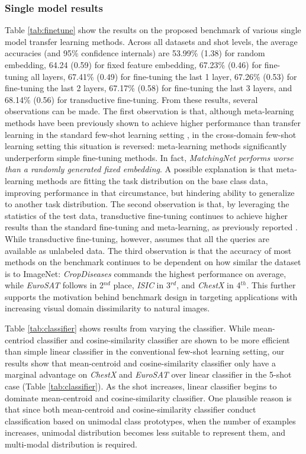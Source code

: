 \documentclass[runningheads]{llncs}
\begin{document}
\subsubsection{Single model results}
\label{subsec:single}
Table \ref{tab:finetune} show the results on the proposed benchmark of various single model transfer learning methods. Across all datasets and shot levels, the average accuracies (and 95\% confidence internals) are 53.99\% (1.38) for random embedding, 64.24 (0.59) for fixed feature embedding, 67.23\% (0.46) for fine-tuning all layers, 67.41\% (0.49) for fine-tuning the last 1 layer, 67.26\% (0.53) for fine-tuning the last 2 layers, 67.17\% (0.58) for fine-tuning the last 3 layers, and 68.14\% (0.56) for transductive fine-tuning.  From these results, several observations can be made. The first observation is that, although meta-learning methods have been previously shown to achieve higher performance than transfer learning in the standard few-shot learning setting \cite{vinyals2016matching,chen2018a}, in the cross-domain few-shot learning setting this situation is reversed: meta-learning methods significantly underperform simple fine-tuning methods. In fact, \emph{ MatchingNet performs worse than a randomly generated fixed embedding}. A possible explanation is that meta-learning methods are fitting the task distribution on the base class data, improving performance in that circumstance, but hindering ability to generalize to another task distribution. The second observation is that, by leveraging the statistics of the test data, transductive fine-tuning continues to achieve higher results than the standard fine-tuning and meta-learning, as previously reported \cite{dhillonfsbaseline}. While transductive fine-tuning, however, assumes that all the queries are available as unlabeled data. The third observation is that the accuracy of most methods on the benchmark continues to be dependent on how similar the dataset is to ImageNet: \textit{CropDiseases} commands the highest performance on average, while \textit{EuroSAT} follows in 2$^{nd}$ place, \textit{ISIC} in 3$^{rd}$, and \textit{ChestX} in 4$^{th}$. This further supports the motivation behind benchmark design in targeting applications with increasing visual domain dissimilarity to natural images. 

Table \ref{tab:classifier} shows results from varying the classifier. While mean-centriod classifier and cosine-similarity classifier are shown to be more efficient than simple linear classifier in the conventional few-shot learning setting, our results show that mean-centroid and cosine-similarity classifier only have a marginal advantage on \textit{ChestX} and \textit{EuroSAT} over linear classifier in the 5-shot case (Table \ref{tab:classifier}). As the shot increases, linear classifier begins to dominate mean-centroid and cosine-similarity classifier. One plausible reason is that since both mean-centroid and cosine-similarity classifier conduct classification based on unimodal class prototypes, when the number of examples increases, unimodal distribution becomes less suitable to represent them, and multi-modal distribution is required.
\end{document}
